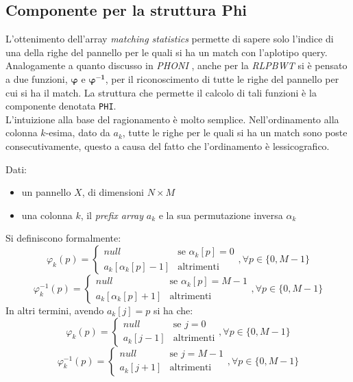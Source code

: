 \subsection{Componente per la struttura Phi}
\label{secphi}
L'ottenimento dell'array \textit{matching statistics} permette di sapere solo
l'indice di una della righe del pannello per le quali si ha un match con
l'aplotipo query. Analogamente a quanto discusso in \textit{PHONI} \cite{phoni},
anche per la \textit{RLPBWT} si è pensato a due funzioni, $\boldsymbol\varphi$ e
$\boldsymbol\varphi\mathbf{^{-1}}$, per il riconoscimento di tutte le
righe del pannello per cui si ha il match. La struttura che permette il calcolo
di tali funzioni è la componente denotata \texttt{PHI}.\\
L'intuizione alla base del ragionamento è molto semplice. Nell'ordinamento alla
colonna $k$-esima, dato da $a_k$, tutte le righe per le quali si ha un match
sono poste consecutivamente, questo a causa del fatto che l'ordinamento è
lessicografico.
\begin{definizione}
  Dati:
  \begin{itemize}
    \item un pannello $X$, di dimensioni $N\times M$
    \item una colonna $k$, il \textit{prefix array} $a_k$ e la sua permutazione
    inversa $\alpha_k$
  \end{itemize}
  Si definiscono formalmente:
  \[\varphi_k(p)=
    \begin{cases}
      null&\mbox{se }\alpha_k[p]=0\\
      a_k[\alpha_k[p]-1]&\mbox{altrimenti}
    \end{cases},\forall p\in\{0,M-1\}
  \]
  \[\varphi^{-1}_k(p)=
    \begin{cases}
      null&\mbox{se }\alpha_k[p]=M-1\\
      a_k[\alpha_k[p]+1]&\mbox{altrimenti}
    \end{cases},\forall p\in\{0,M-1\}
  \]
  In altri termini, avendo $a_k[j]=p$ si ha che:
  \[\varphi_k(p)=
    \begin{cases}
      null&\mbox{se }j=0\\
      a_k[j-1]&\mbox{altrimenti}
    \end{cases},\forall p\in\{0,M-1\}
  \]
  \[\varphi^{-1}_k(p)=
    \begin{cases}
      null&\mbox{se }j=M-1\\
      a_k[j+1]&\mbox{altrimenti}
    \end{cases},\forall p\in\{0,M-1\}
  \]
\end{definizione}
